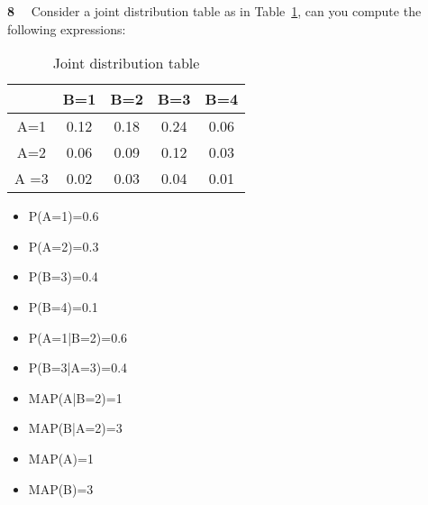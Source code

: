 \begin{newquestion}{\textbf{8}~~}
Consider a joint distribution table as in Table~\ref{tab:jointdistribution1}, can you compute the following expressions: 
\begin{table}[h!]
    \centering
    \begin{tabular}{|c|c|c|c|c|}
    \hline
         & B=1 & B=2 & B=3 & B=4 \\
         \hline
       A=1 & 0.12 & 0.18 & 0.24 & 0.06 \\ 
       A=2 & 0.06 & 0.09 & 0.12 & 0.03 \\
       A =3 & 0.02 & 0.03 & 0.04 & 0.01 \\
       \hline
    \end{tabular}
    \caption{Joint distribution table}
    \label{tab:jointdistribution1}
\end{table}
\begin{itemize}
    \item P(A=1)=0.6
    \item P(A=2)=0.3
    \item P(B=3)=0.4 
    \item P(B=4)=0.1
    \item P(A=1|B=2)=0.6
    \item P(B=3|A=3)=0.4
    \item MAP(A|B=2)=1
    \item MAP(B|A=2)=3
    \item MAP(A)=1
    \item MAP(B)=3
\end{itemize}
\end{newquestion}

